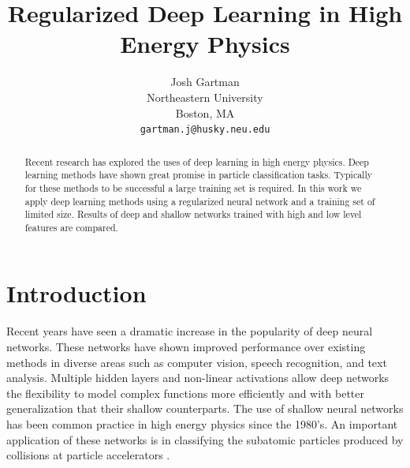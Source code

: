 \documentclass[12pt,letterpaper]{article}
\begin{document}
\title{Regularized Deep Learning in High Energy Physics}

\author{Josh Gartman\\
Northeastern University\\
Boston, MA\\
{\tt\small gartman.j@husky.neu.edu}
}

\maketitle

\begin{abstract}
  Recent research has explored the uses of deep learning in high energy physics.  Deep learning methods have shown great promise in particle classification tasks.  Typically for these methods to be successful a large training set is required.  In this work we apply deep learning methods using a regularized neural network and a training set of limited size.  Results of deep and shallow networks trained with high and low level features are compared.
\end{abstract}

\section{Introduction}
Recent years have seen a dramatic increase in the popularity of deep neural networks.  These networks have shown improved performance over existing methods in diverse areas such as computer vision, speech recognition, and text analysis.  Multiple hidden layers and non-linear activations allow deep networks the flexibility to model complex functions more efficiently and with better generalization that their shallow counterparts.  The use of shallow neural networks has been common practice in high energy physics since the 1980's.  An important application of these networks is in classifying the subatomic particles produced by collisions at particle accelerators \cite{Abreu:1992jp}.
\end{document}
